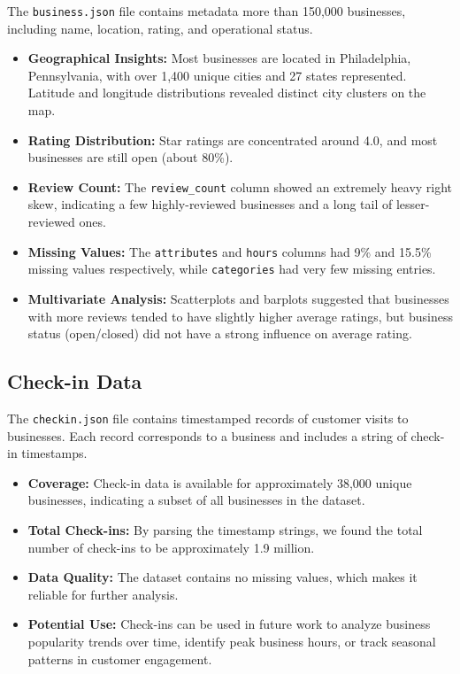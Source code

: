 \documentclass[conference]{IEEEtran}
\begin{document}
The \texttt{business.json} file contains metadata more than 150,000 businesses,
including name, location, rating, and operational status.
\begin{itemize}
    \item \textbf{Geographical Insights:} Most businesses are located in Philadelphia,
    Pennsylvania, with over 1,400 unique cities and 27 states represented. Latitude
    and longitude distributions revealed distinct city clusters on the map.
    \item \textbf{Rating Distribution:} Star ratings are concentrated around 4.0, 
    and most businesses are still open (about 80\%).
    \item \textbf{Review Count:} The \texttt{review\_count} column showed an
    extremely heavy right skew, indicating a few highly-reviewed businesses and
    a long tail of lesser-reviewed ones.
    \item \textbf{Missing Values:} The \texttt{attributes} and \texttt{hours}
    columns had 9\% and 15.5\% missing values respectively, while \texttt{categories}
    had very few missing entries.
    \item \textbf{Multivariate Analysis:} Scatterplots and barplots suggested
    that businesses with more reviews tended to have slightly higher average
    ratings, but business status (open/closed) did not have a strong influence
    on average rating.
\end{itemize}

\subsection{Check-in Data}

The \texttt{checkin.json} file contains timestamped records of customer visits
to businesses. Each record corresponds to a business and includes a string of
check-in timestamps.
\begin{itemize}
    \item \textbf{Coverage:} Check-in data is available for approximately 38,000
    unique businesses, indicating a subset of all businesses in the dataset.
    \item \textbf{Total Check-ins:} By parsing the timestamp strings, we found
    the total number of check-ins to be approximately 1.9 million.
    \item \textbf{Data Quality:} The dataset contains no missing values, which
    makes it reliable for further analysis.
    \item \textbf{Potential Use:} Check-ins can be used in future work to analyze
    business popularity trends over time, identify peak business hours, or track
    seasonal patterns in customer engagement.
\end{itemize}
\end{document}
